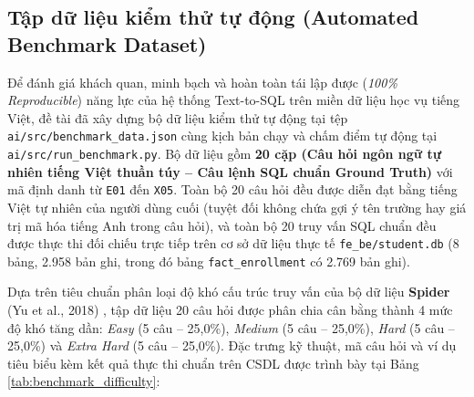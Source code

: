 \documentclass[12pt,a4paper]{report}
\begin{document}
\subsection{Tập dữ liệu kiểm thử tự động (Automated Benchmark Dataset)}

Để đánh giá khách quan, minh bạch và hoàn toàn tái lập được (\textit{100\% Reproducible}) năng lực của hệ thống Text-to-SQL trên miền dữ liệu học vụ tiếng Việt, đề tài đã xây dựng bộ dữ liệu kiểm thử tự động tại tệp \texttt{ai/src/benchmark\_data.json} cùng kịch bản chạy và chấm điểm tự động tại \texttt{ai/src/run\_benchmark.py}. Bộ dữ liệu gồm \textbf{20 cặp (Câu hỏi ngôn ngữ tự nhiên tiếng Việt thuần túy -- Câu lệnh SQL chuẩn Ground Truth)} với mã định danh từ \texttt{E01} đến \texttt{X05}. Toàn bộ 20 câu hỏi đều được diễn đạt bằng tiếng Việt tự nhiên của người dùng cuối (tuyệt đối không chứa gợi ý tên trường hay giá trị mã hóa tiếng Anh trong câu hỏi), và toàn bộ 20 truy vấn SQL chuẩn đều được thực thi đối chiếu trực tiếp trên cơ sở dữ liệu thực tế \texttt{fe\_be/student.db} (8 bảng, 2.958 bản ghi, trong đó bảng \texttt{fact\_enrollment} có 2.769 bản ghi).

Dựa trên tiêu chuẩn phân loại độ khó cấu trúc truy vấn của bộ dữ liệu \textbf{Spider} (Yu et al., 2018) \cite{yu2018spider}, tập dữ liệu 20 câu hỏi được phân chia cân bằng thành 4 mức độ khó tăng dần: \textit{Easy} (5 câu -- 25,0\%), \textit{Medium} (5 câu -- 25,0\%), \textit{Hard} (5 câu -- 25,0\%) và \textit{Extra Hard} (5 câu -- 25,0\%). Đặc trưng kỹ thuật, mã câu hỏi và ví dụ tiêu biểu kèm kết quả thực thi chuẩn trên CSDL được trình bày tại Bảng \ref{tab:benchmark_difficulty}:
\end{document}
